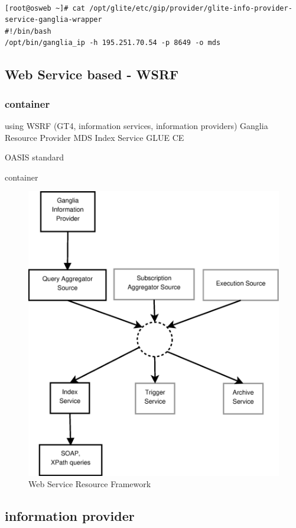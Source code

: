 \begin{lstlisting}

[root@osweb ~]# cat /opt/glite/etc/gip/provider/glite-info-provider-service-ganglia-wrapper
#!/bin/bash
/opt/bin/ganglia_ip -h 195.251.70.54 -p 8649 -o mds
\end{lstlisting}

\subsection{Web Service based - WSRF}

\subsubsection{container}
using WSRF (GT4, information services, information providers)
Ganglia Resource Provider
MDS Index Service
GLUE CE 

OASIS standard

container
\begin{figure}[htb]
\centering
 \includegraphics[width=5in]{images/wsrf.eps}
\caption{Web Service Resource Framework}
\label{figure:wsrf}
\end{figure}

\subsection{information provider}

